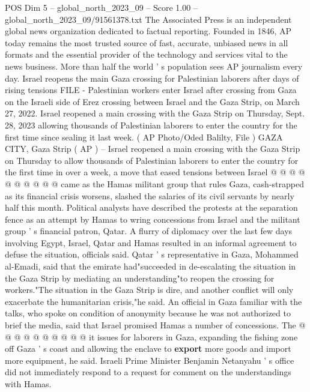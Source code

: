 \begin{textsample}{POS Dim 5 – global\_north\_2023\_09 – Score 1.00 – global\_north\_2023\_09/91561378.txt}  \label{ex:f5_pos_446}
The Associated Press is an independent global news organization dedicated to factual reporting.
Founded in 1846, AP today remains the most trusted source of fast, accurate, unbiased news in all formats and the essential provider of the technology and services vital to the news business.
More than half the world ' s population sees AP journalism every day.
Israel reopens the main Gaza crossing for Palestinian laborers after days of rising tensions FILE - Palestinian workers enter Israel after crossing from Gaza on the Israeli side of Erez crossing between Israel and the Gaza Strip, on March 27, 2022.
Israel reopened a main crossing with the Gaza Strip on Thursday, Sept. 28, 2023 allowing thousands of Palestinian laborers to enter the country for the first time since sealing it last week. ( AP Photo/Oded Balilty, File ) GAZA CITY, Gaza Strip ( AP ) -- Israel reopened a main crossing with the Gaza Strip on Thursday to allow thousands of Palestinian laborers to enter the country for the first time in over a week, a move that eased tensions between Israel @ @ @ @ @ @ @ @ @ @ came as the Hamas militant group that rules Gaza, cash-strapped as its financial crisis worsens, slashed the salaries of its civil servants by nearly half this month.
Political analysts have described the protests at the separation fence as an attempt by Hamas to wring concessions from Israel and the militant group ' s financial patron, Qatar.
A flurry of diplomacy over the last few days involving Egypt, Israel, Qatar and Hamas resulted in an informal agreement to defuse the situation, officials said.
Qatar ' s representative in Gaza, Mohammed al-Emadi, said that the emirate had"succeeded in de-escalating the situation in the Gaza Strip by mediating an understanding"to reopen the crossing for workers."The situation in the Gaza Strip is dire, and another conflict will only exacerbate the humanitarian crisis,"he said.
An official in Gaza familiar with the talks, who spoke on condition of anonymity because he was not authorized to brief the media, said that Israel promised Hamas a number of concessions.
The @ @ @ @ @ @ @ @ @ @ it issues for laborers in Gaza, expanding the fishing zone off Gaza ' s coast and allowing the enclave to \textbf{export} more goods and import more equipment, he said.
Israeli Prime Minister Benjamin Netanyahu ' s office did not immediately respond to a request for comment on the understandings with Hamas.

\end{textsample}

